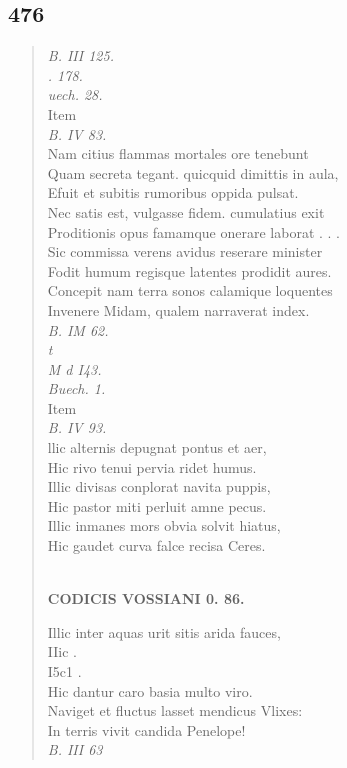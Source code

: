 \documentclass[11pt, a4paper]{report}
\begin{document}
            \subsection*{476}
      \begin{verse}
      \textit{B. III 125.} \\ \textit{. 178.} \\ \textit{uech. 28.} \\ Item \\ \textit{B. IV 83.} \\ Nam citius flammas mortales ore tenebunt \\ Quam secreta tegant. quicquid dimittis in aula, \\ Efuit et subitis rumoribus oppida pulsat. \\ Nec satis est, vulgasse fidem. cumulatius exit \\ Proditionis opus famamque onerare laborat . . . \\ Sic commissa verens avidus reserare minister \\ Fodit humum regisque latentes prodidit aures. \\ Concepit nam terra sonos calamique loquentes \\ Invenere Midam, qualem narraverat index. \\ \textit{B. IM 62.} \\ \textit{t} \\ \textit{M d I43.} \\ \textit{Buech. 1.} \\ Item \\ \textit{B. IV 93.} \\ llic alternis depugnat pontus et aer, \\ Hic rivo tenui pervia ridet humus. \\ Illic divisas conplorat navita puppis, \\ Hic pastor miti perluit amne pecus. \\ Illic inmanes mors obvia solvit hiatus, \\ Hic gaudet curva falce recisa Ceres. \\ 
        ﻿\pagebreak 
    \begin{center} \textbf{CODICIS VOSSIANI 0. 86.} \end{center} \marginpar{[349]} Illic inter aquas urit sitis arida fauces, \\  \lbrack IIic \rbrack  . \\  \lbrack I5c1 . \\ Hic dantur caro basia multo viro. \\ Naviget et fluctus lasset mendicus Vlixes: \\ In terris vivit candida Penelope! \\ \textit{B. III 63} \\ 
      \end{verse}
  
\end{document}

